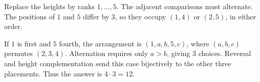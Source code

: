 Replace the heights by ranks $1,\ldots,5$. The adjacent comparisons must alternate. The positions of $1$ and $5$ differ by $3$, so they occupy $(1,4)$ or $(2,5)$, in either order.

If $1$ is first and $5$ fourth, the arrangement is $(1,a,b,5,c)$, where $(a,b,c)$ permutes $(2,3,4)$. Alternation requires only $a>b$, giving $3$ choices. Reversal and height complementation send this case bijectively to the other three placements. Thus the answer is $\boxed{4\cdot3=12}$.
